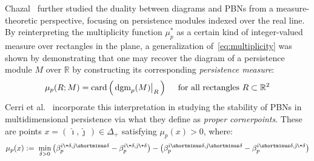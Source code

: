 Chazal~\cite{chazal2016structure} further studied the duality between diagrams and PBNs from a measure-theoretic perspective, focusing on persistence modules indexed over the real line. 
By reinterpreting the multiplicity function $\mu^\ast_p$ as a certain kind of integer-valued measure over rectangles in the plane, a generalization of~\eqref{eq:multiplicity} 
was shown by demonstrating that one may recover the diagram of a persistence module $M$ over $\mathbb{R}$ by constructing its corresponding \emph{persistence measure}:
\begin{equation}\label{eq:measure}
	\mu_p(R; M) = \mathrm{card}\left( \,
	\restr{\mathrm{dgm}_p(M)}{R} \,
	\right) \quad \text{ for all rectangles } R \subset \mathbb{R}^2 
\end{equation}
Cerri et al.~\cite{cerri2013betti} incorporate this interpretation in studying the stability of PBNs in multidimensional persistence via what they define as \emph{proper cornerpoints}. These are points $x = (\, \hat\imath, \hat\jmath \,) \in \Delta_+$ satisfying $\mu_p(x) > 0$, where:
\begin{equation}\label{eq:pbn_cont}
\mu_p(x) := \; \min_{\delta > 0} \left(\beta_p^{\hat\imath \+ \delta, \hat\jmath  \shortminus \delta} - \beta_p^{\hat\imath \+ \delta, \hat\jmath  \+ \delta} \right) - \left(\beta_p^{\hat\imath \shortminus \delta, \hat\jmath \shortminus \delta} - \beta_p^{\hat\imath \shortminus \delta, \hat\jmath  \+ \delta} \right)
\end{equation}
